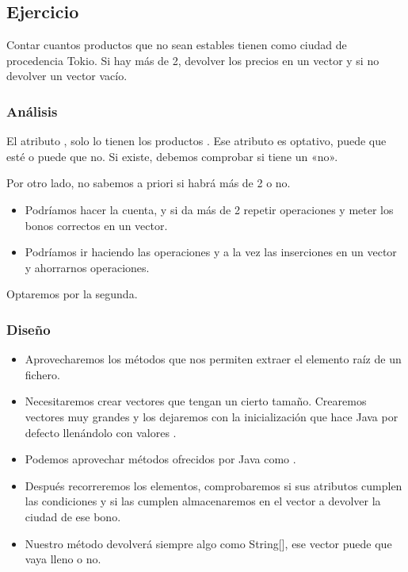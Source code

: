 \documentclass[letterpaper,10pt,spanish]{sphinxmanual}
\begin{document}
\subsection{Ejercicio}
\label{\detokenize{tema6:id13}}
Contar cuantos productos que no sean estables tienen como ciudad de procedencia Tokio. Si hay más de 2, devolver los precios en un vector y si no devolver un vector vacío.


\subsubsection{Análisis}
\label{\detokenize{tema6:id14}}
El atributo , solo lo tienen los productos . Ese atributo es optativo, puede que esté o puede que no. Si existe, debemos comprobar si tiene un «no».

Por otro lado, no sabemos a priori si habrá más de 2 o no.
\begin{itemize}
\item {} 
Podríamos hacer la cuenta, y si da más de 2 repetir operaciones y meter los bonos correctos en un vector.

\item {} 
Podríamos ir haciendo las operaciones y a la vez las inserciones en un vector y ahorrarnos operaciones.

\end{itemize}

Optaremos por la segunda.


\subsubsection{Diseño}
\label{\detokenize{tema6:id15}}\begin{itemize}
\item {} 
Aprovecharemos los métodos que nos permiten extraer el elemento raíz de un fichero.

\item {} 
Necesitaremos crear vectores que tengan un cierto tamaño. Crearemos vectores muy grandes y los dejaremos con la inicialización que hace Java por defecto llenándolo con valores .

\item {} 
Podemos aprovechar métodos ofrecidos por Java como .

\item {} 
Después recorreremos los elementos, comprobaremos si sus atributos cumplen las condiciones y si las cumplen almacenaremos en el vector a devolver la ciudad de ese bono.

\item {} 
Nuestro método devolverá siempre algo como String{[}{]}, ese vector puede que vaya lleno o no.

\end{itemize}
\end{document}
